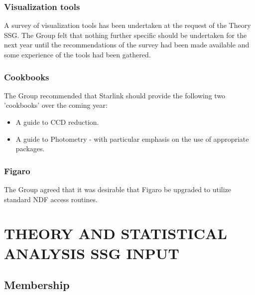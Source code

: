 \subsubsection{Visualization tools}

A survey of visualization tools has been undertaken at the request of
the Theory SSG. The Group felt that nothing further specific should be
undertaken for the next year until the recommendations of the survey
had been made available and some experience of the tools had been
gathered.

\subsubsection{Cookbooks}

The Group recommended that Starlink should provide the following two
'cookbooks' over the coming year:
\begin{itemize}
\item A guide to CCD reduction.
\item A guide to Photometry - with particular emphasis on the use of
appropriate packages.
\end{itemize}

\subsubsection{Figaro}

The Group agreed that it was desirable that Figaro be upgraded to
utilize standard NDF access routines.

\newpage
\section{THEORY AND STATISTICAL ANALYSIS SSG INPUT}
 
\subsection{Membership}

